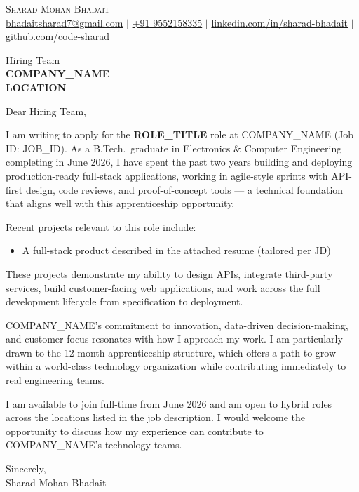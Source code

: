 \documentclass[letterpaper,11pt]{article}
\begin{document}
\begin{center}
    {\Huge \scshape Sharad Mohan Bhadait} \\ \vspace{4pt}
    \small \href{mailto:bhadaitsharad7@gmail.com}{bhadaitsharad7@gmail.com} $|$
    \href{https://wa.me/919552158335}{+91 9552158335} $|$
    \href{https://linkedin.com/in/sharad-bhadait}{linkedin.com/in/sharad-bhadait} $|$
    \href{https://github.com/code-sharad}{github.com/code-sharad}
\end{center}

\vspace{12pt}

\noindent Hiring Team \\
\textbf{COMPANY_NAME} \\
\textbf{LOCATION}

\vspace{12pt}

\noindent Dear Hiring Team,

\vspace{8pt}

\noindent I am writing to apply for the \textbf{ROLE\_TITLE} role at COMPANY\_NAME (Job ID: JOB\_ID). As a B.Tech.\ graduate in Electronics \& Computer Engineering completing in June 2026, I have spent the past two years building and deploying production-ready full-stack applications, working in agile-style sprints with API-first design, code reviews, and proof-of-concept tools — a technical foundation that aligns well with this apprenticeship opportunity.

\vspace{8pt}

\noindent Recent projects relevant to this role include:
\begin{itemize}
  \item A full-stack product described in the attached resume (tailored per JD)
\end{itemize}
\noindent These projects demonstrate my ability to design APIs, integrate third-party services, build customer-facing web applications, and work across the full development lifecycle from specification to deployment.

\vspace{8pt}

\noindent COMPANY\_NAME's commitment to innovation, data-driven decision-making, and customer focus resonates with how I approach my work. I am particularly drawn to the 12-month apprenticeship structure, which offers a path to grow within a world-class technology organization while contributing immediately to real engineering teams.

\vspace{8pt}

\noindent I am available to join full-time from June 2026 and am open to hybrid roles across the locations listed in the job description. I would welcome the opportunity to discuss how my experience can contribute to COMPANY\_NAME's technology teams.

\vspace{12pt}

\noindent Sincerely,\\
\noindent Sharad Mohan Bhadait
\end{document}
